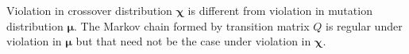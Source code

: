 Violation in crossover distribution $\bm{\chi}$ is different from violation in mutation distribution $\bm{\mu}$. 
The Markov chain formed by transition matrix $Q$ is regular under violation in $\bm{\mu}$ 
but that need not be the case under violation in  $\bm{\chi}$. 
% 
% 
% 
% 
% 
